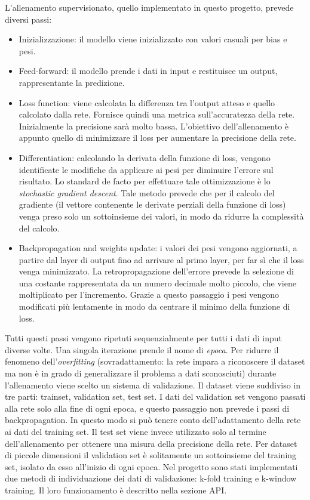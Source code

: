 \documentclass{article}
\begin{document}
L'allenamento supervisionato, quello implementato in questo progetto, prevede diversi passi:
\begin{itemize}
\item Inizializzazione: il modello viene inizializzato con valori casuali per bias e pesi. 
\item Feed-forward: il modello prende i dati in input e restituisce un output, rappresentante la predizione.
\item Loss function: viene calcolata la differenza tra l'output atteso e quello calcolato dalla rete. Fornisce quindi una metrica sull'accuratezza della rete.  Inizialmente la precisione sarà molto bassa. L'obiettivo dell'allenamento è appunto quello di minimizzare il loss per aumentare la precisione della rete. 
\item Differentiation: calcolando la derivata della funzione di loss, vengono identificate le modifiche da applicare ai pesi per diminuire l'errore sul risultato. Lo standard de facto per effettuare tale ottimizzazione è lo \textit{stochastic gradient descent}. Tale metodo prevede che per il calcolo del gradiente (il vettore contenente le derivate perziali della funzione di loss) venga preso solo un sottoinsieme dei valori, in modo da ridurre la complessità del calcolo.  
\item Backpropagation and weights update: i valori dei pesi vengono aggiornati, a partire dal layer di output fino ad arrivare al primo layer, per far sì che il loss venga minimizzato. La retropropagazione dell'errore prevede la selezione di una costante rappresentata da un numero decimale molto piccolo, che viene moltiplicato per l'incremento. Grazie a questo passaggio i pesi vengono modificati più lentamente in modo da centrare il minimo della funzione di loss.
\end{itemize}
Tutti questi passi vengono ripetuti sequenzialmente per tutti i dati di input diverse volte. Una singola iterazione prende il nome di \textit{epoca}.
Per ridurre il fenomeno dell'\textit{overfitting} (sovradattamento: la rete impara a riconoscere il dataset ma non è in grado di generalizzare il problema a dati sconosciuti) durante l'allenamento viene scelto un sistema di validazione. Il dataset viene suddiviso in tre parti: trainset, validation set, test set. I dati del validation set vengono passati alla rete solo alla fine di ogni epoca, e questo passaggio non prevede i passi di backpropagation. In questo modo si può tenere conto dell'adattamento della rete ai dati del training set. Il test set viene invece utilizzato solo al termine dell'allenamento per ottenere una misura della precisione della rete.
Per dataset di piccole dimensioni il validation set è solitamente un sottoinsieme del training set, isolato da esso all'inizio di ogni epoca. Nel progetto sono stati implementati due metodi di individuazione dei dati di validazione: k-fold training e k-window training. Il loro funzionamento è descritto nella sezione API.
\end{document}
